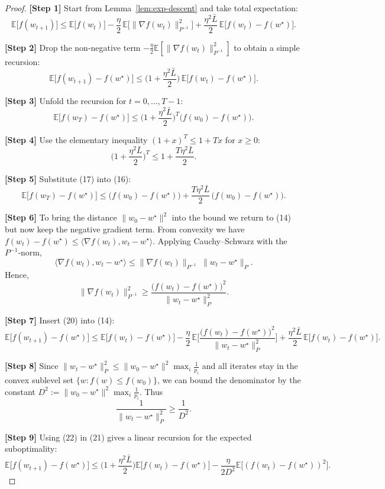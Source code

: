 \documentclass{article}
\newcommand{\E}{\mathbb{E}}
\newcommand{\grad}{\nabla}
\begin{document}
\begin{proof}
\textbf{[Step 1]}  Start from Lemma~\ref{lem:exp-descent} and take total expectation:
\[
\E\!\big[f(w_{t+1})\big]
\le \E\!\big[f(w_t)\big]
-\frac{\eta}{2}\,\E\!\big[\|\grad f(w_t)\|_{P^{-1}}^{2}\big]
+\frac{\eta^{2}\bar L}{2}\,\E\!\big[f(w_t)-f(w^\star)\big].
\tag{14}
\]

\textbf{[Step 2]}  Drop the non‑negative term $-\frac{\eta}{2}\E[\|\grad f(w_t)\|_{P^{-1}}^{2}]$ to obtain a simple recursion:
\[
\E\!\big[f(w_{t+1})-f(w^\star)\big]
\le \Big(1+\frac{\eta^{2}\bar L}{2}\Big)\,\E\!\big[f(w_t)-f(w^\star)\big].
\tag{15}
\]

\textbf{[Step 3]}  Unfold the recursion for $t=0,\dots ,T-1$:
\[
\E\!\big[f(w_T)-f(w^\star)\big]
\le \Big(1+\frac{\eta^{2}\bar L}{2}\Big)^{T}\big(f(w_0)-f(w^\star)\big).
\tag{16}
\]

\textbf{[Step 4]}  Use the elementary inequality $(1+x)^{T}\le 1+Tx$ for $x\ge0$:
\[
\Big(1+\frac{\eta^{2}\bar L}{2}\Big)^{T}
\le 1+\frac{T\eta^{2}\bar L}{2}.
\tag{17}
\]

\textbf{[Step 5]}  Substitute (17) into (16):
\[
\E\!\big[f(w_T)-f(w^\star)\big]
\le \big(f(w_0)-f(w^\star)\big)
+\frac{T\eta^{2}\bar L}{2}\,\big(f(w_0)-f(w^\star)\big).
\tag{18}
\]

\textbf{[Step 6]}  To bring the distance $\|w_0-w^\star\|^{2}$ into the bound we return to (14) but now keep the negative gradient term.  
From convexity we have $f(w_t)-f(w^\star)\le\langle\grad f(w_t),w_t-w^\star\rangle$.  
Applying Cauchy–Schwarz with the $P^{-1}$‑norm,
\[
\langle\grad f(w_t),w_t-w^\star\rangle
\le \|\grad f(w_t)\|_{P^{-1}}\;\|w_t-w^\star\|_{P}.
\tag{19}
\]
Hence,
\[
\|\grad f(w_t)\|_{P^{-1}}^{2}
\ge \frac{\big(f(w_t)-f(w^\star)\big)^{2}}{\|w_t-w^\star\|_{P}^{2}}.
\tag{20}
\]

\textbf{[Step 7]}  Insert (20) into (14):
\[
\E\!\big[f(w_{t+1})-f(w^\star)\big]
\le \E\!\big[f(w_t)-f(w^\star)\big]
-\frac{\eta}{2}\,\E\!\Big[\frac{\big(f(w_t)-f(w^\star)\big)^{2}}{\|w_t-w^\star\|_{P}^{2}}\Big]
+\frac{\eta^{2}\bar L}{2}\,\E\!\big[f(w_t)-f(w^\star)\big].
\tag{21}
\]

\textbf{[Step 8]}  Since $\|w_t-w^\star\|_{P}^{2}\le \|w_0-w^\star\|^{2}\max_i\frac{1}{p_i}$ and all iterates stay in the convex sublevel set $\{w:f(w)\le f(w_0)\}$, we can bound the denominator by the constant $D^{2}:=\|w_0-w^\star\|^{2}\max_i\frac{1}{p_i}$. Thus
\[
\frac{1}{\|w_t-w^\star\|_{P}^{2}}\ge\frac{1}{D^{2}}.
\tag{22}
\]

\textbf{[Step 9]}  Using (22) in (21) gives a linear recursion for the expected suboptimality:
\[
\E\!\big[f(w_{t+1})-f(w^\star)\big]
\le \Big(1+\frac{\eta^{2}\bar L}{2}\Big)\E\!\big[f(w_t)-f(w^\star)\big]
-\frac{\eta}{2D^{2}}\E\!\big[(f(w_t)-f(w^\star))^{2}\big].
\tag{23}
\]


\end{proof}
\end{document}
